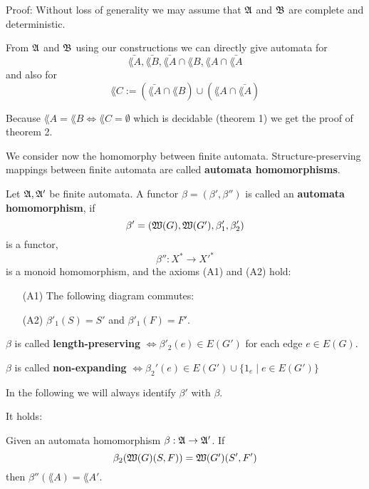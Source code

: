 Proof: Without loss of generality we may assume that $\mbox{$\mathfrak{A}$}$ and $\mbox{$\mathfrak{B}$}$ are
complete and deterministic. 

From $\mbox{$\mathfrak{A}$}$ and $\mbox{$\mathfrak{B}$}$ using our constructions we can directly give automata
for 
\[\bar{\lang{A}}, \bar{\lang{B}}, \bar{\lang{A}} \cap
\lang{B}, \lang{A} \cap \bar{\lang{A}}\]
and also for 
\[ \lang{C} := (\bar{\lang{A}} \cap \lang{B}) \cup (\lang{A} \cap
\bar{\lang{A}}) \]

Because $\lang{A} = \lang{B} \Leftrightarrow \lang{C} = \emptyset$ which
is decidable (theorem 1) we get the proof of theorem 2.

We consider now the homomorphy between finite automata. Structure-preserving
mappings between finite automata are called {\bf automata homomorphisms}.

\begin{definition}
Let $\mbox{$\mathfrak{A}$}, \mbox{$\mathfrak{A'}$}$ be finite automata. A functor $\beta = (\beta', \beta'')$
is called an {\bf automata homomorphism}, if
\[ \beta' = (\mbox{$\mathfrak{W}(G)$}, \mbox{$\mathfrak{W}(G')$}, \beta'_1, \beta'_2) \]
is a functor,
\[ \beta'': X^* \to X'^*	\]
is a monoid homomorphism, and the axioms (A1) and (A2) hold:
\begin{itemize}
  \item[(A1)] The following diagram commutes:
  
  
  \item[(A2)] $\beta'_1(S) = S'$ and $\beta'_1(F) = F'$. 
\end{itemize}

$\beta$ is called {\bf length-preserving} $\Leftrightarrow \beta'_2(e) \in
E(G')$ for each edge $e \in E(G)$.

$\beta$ is called {\bf non-expanding} $\Leftrightarrow \beta_2'(e) \in E(G')
\cup \{ 1_e \mid e \in E(G') \}$
\end{definition}

In the following we will always identify $\beta'$ with $\beta$.

It holds:

\begin{theorem}
Given an automata homomorphism $\beta: \mbox{$\mathfrak{A}$} \to \mbox{$\mathfrak{A'}$}$. If
\[\beta_2(\mbox{$\mathfrak{W}(G)$}(S,F)) = \mbox{$\mathfrak{W}(G')$}(S',F')\]
then $\beta''(\lang{A}) = \lang{A'}$.
\end{theorem}

